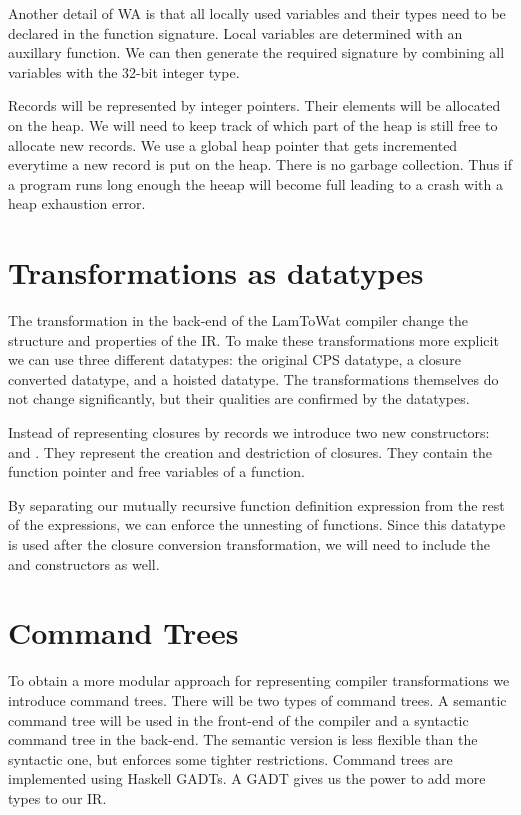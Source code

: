 Another detail of \ac{WA} is that all locally used variables and their types need to be declared in the function signature. Local variables are determined with an auxillary function. We can then generate the required signature by combining all variables with the 32-bit integer type.

Records will be represented by integer pointers. Their elements will be allocated on the heap. We will need to keep track of which part of the heap is still free to allocate new records. We use a global heap pointer that gets incremented everytime a new record is put on the heap. There is no garbage collection. Thus if a program runs long enough the heeap will become full leading to a crash with a heap exhaustion error. 

\section{\label{section:comtree}Transformations as datatypes}
The transformation in the back-end of the LamToWat compiler change the structure and properties of the \ac{IR}. To make these transformations more explicit we can use three different datatypes: the original \ac{CPS} datatype, a closure converted datatype, and a hoisted datatype. The transformations themselves do not change significantly, but their qualities are confirmed by the datatypes.

Instead of representing closures by records we introduce two new constructors:  and . They represent the creation and destriction of closures. They contain the function pointer and free variables of a function.

By separating our mutually recursive function definition expression from the rest of the expressions, we can enforce the unnesting of functions. Since this datatype is used after the closure conversion transformation, we will need to include the  and  constructors as well.

\section{\label{section:comtree}Command Trees}
To obtain a more modular approach for representing compiler transformations we introduce command trees\autocite{commandtreespoulsen}. There will be two types of command trees. A semantic command tree will be used in the front-end of the compiler and a syntactic command tree in the back-end. The semantic version is less flexible than the syntactic one, but enforces some tighter restrictions. Command trees are implemented using Haskell \acp{GADT}. A \ac{GADT} gives us the power to add more types to our \ac{IR}.

